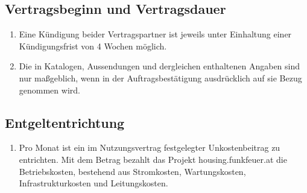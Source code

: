 \documentclass[parskip=half]{article}
\begin{document}
\subsection{Vertragsbeginn und Vertragsdauer}
\begin{enumerate}
\item Eine Kündigung beider Vertragspartner ist jeweils unter Einhaltung einer 
Kündigungsfrist von 4 Wochen möglich.
\item Die in Katalogen, Aussendungen und dergleichen enthaltenen Angaben sind nur
maßgeblich, wenn in der Auftragsbestätigung ausdrücklich auf sie Bezug genommen
wird.
\end{enumerate}

\subsection{Entgeltentrichtung}
\begin{enumerate}
\item Pro Monat ist ein im Nutzungsvertrag festgelegter Unkostenbeitrag zu entrichten. Mit dem
Betrag bezahlt das \mbox Projekt housing.funkfeuer.at die Betriebskosten, bestehend aus
Stromkosten, Wartungskosten, Infrastrukturkosten und Leitungskosten.
\end{enumerate}
\end{document}
